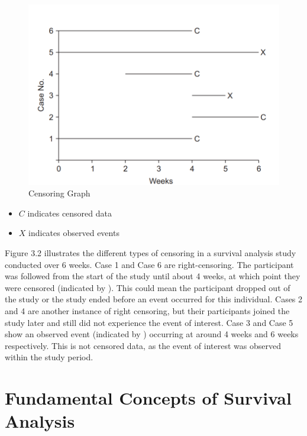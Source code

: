 \documentclass[12pt]{report}
\begin{document}
	\begin{figure}[H]
		\centering
		\includegraphics[width=01\linewidth]{Figure 3/3.2.png}
		\caption{Censoring Graph}
		\label{Figure 3.2}
	\end{figure}
	
	
	\begin{itemize}
		
		\item \(C\) indicates censored data
		\item  \(X\) indicates observed events
		
		
	\end{itemize}
	
	Figure 3.2 illustrates the different types of censoring in a survival analysis study conducted over 6 weeks. Case 1 and Case 6 are right-censoring. The participant was followed from the start of the study until about 4 weeks, at which point they were censored (indicated by ). This could mean the participant dropped out of the study or the study ended before an event occurred for this individual. Cases 2 and 4 are another instance of right censoring, but their participants joined the study later and still did not experience the event of interest. Case 3 and Case 5 show an observed event (indicated by ) occurring at around 4 weeks and 6 weeks respectively. This is not censored data, as the event of interest was observed within the study period.
	
	\section{Fundamental Concepts of Survival Analysis}
	
\end{document}
